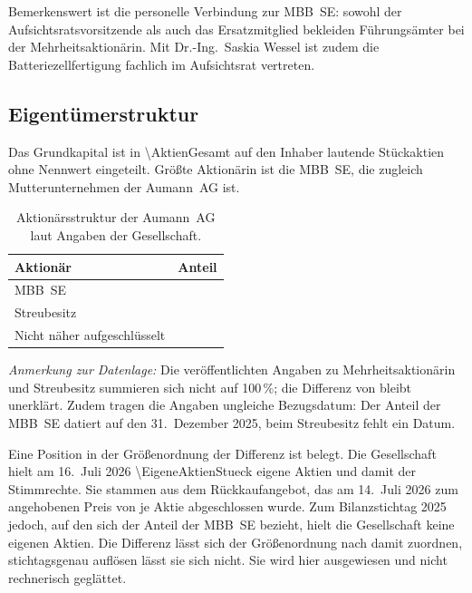 \noindent Bemerkenswert ist die personelle Verbindung zur MBB~SE: sowohl der
Aufsichtsratsvorsitzende als auch das Ersatzmitglied bekleiden
F\"uhrungs\-\"amter bei der Mehrheitsaktion\"arin. Mit
Dr.-Ing.\ Saskia Wessel ist zudem die Batteriezellfertigung fachlich im
Aufsichtsrat vertreten.

\subsection{Eigent\"umerstruktur}
\label{subsec:eigentuemer}

Das Grundkapital ist in \num{\AktienGesamt} auf den Inhaber lautende
St\"uckaktien ohne Nennwert
eingeteilt.
Gr\"o{\ss}te Aktion\"arin ist die MBB~SE, die zugleich Mutterunternehmen der
Aumann~AG ist.

\begin{table}[htbp]
\centering
\caption{Aktion\"arsstruktur der Aumann~AG laut Angaben der Gesellschaft.}
\label{tab:eigentuemer}
\begin{tabular}{@{}lr@{}}
\toprule
\textbf{Aktion\"ar} & \textbf{Anteil}\\
\midrule
MBB~SE                          & \Pct{\AnteilMBB}\\
Streubesitz                     & \Pct{\FreefloatAnteil}\\
Nicht n\"aher aufgeschl\"usselt & \Pct{\RestanteilUngeklaert}\\
\bottomrule
\end{tabular}
\end{table}

\noindent \emph{Anmerkung zur Datenlage:} Die ver\"offentlichten Angaben zu
Mehrheitsaktion\"arin und Streubesitz summieren sich nicht auf 100\,\%; die
Differenz von \Pct{\RestanteilUngeklaert} bleibt unerkl\"art. Zudem tragen
die Angaben ungleiche Bezugsdatum: Der Anteil der MBB~SE datiert auf den
31.~Dezember 2025, beim Streubesitz fehlt ein Datum.

Eine Position in der Gr\"o{\ss}enordnung der Differenz ist belegt. Die
Gesellschaft hielt am 16.~Juli 2026 \num{\EigeneAktienStueck} eigene Aktien
und damit \Pct{\EigeneAktienAnteil} der
Stimmrechte.
Sie stammen aus dem R\"uckkaufangebot, das am 14.~Juli 2026 zum angehobenen
Preis von \EURje{\RueckkaufPreisZFVI} je Aktie abgeschlossen
wurde.
Zum Bilanzstichtag 2025 jedoch, auf den sich der Anteil der MBB~SE bezieht,
hielt die Gesellschaft keine eigenen Aktien. Die Differenz
l\"asst sich der Gr\"o{\ss}enordnung nach damit zuordnen, stichtagsgenau
aufl\"osen l\"asst sie sich nicht. Sie wird hier ausgewiesen und nicht
rechnerisch gegl\"attet.

